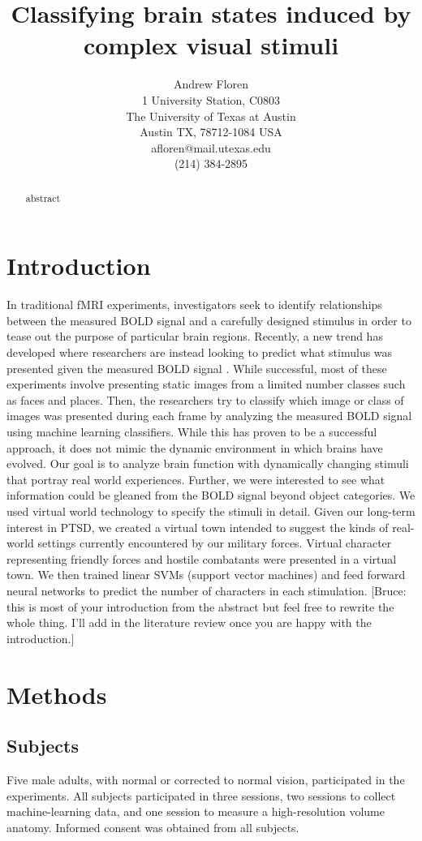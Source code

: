 \documentclass[final]{article}
\title{Classifying brain states induced by complex visual stimuli}
\author{Andrew Floren\\
1 University Station, C0803\\
The University of Texas at Austin\\
Austin TX, 78712-1084 USA\\
afloren@mail.utexas.edu\\
(214) 384-2895\\}
\date{}
\begin{document}
\maketitle

\begin{abstract}
abstract
\end{abstract}

\section{Introduction}
In traditional fMRI experiments, investigators seek to identify relationships between the measured BOLD signal and a carefully designed stimulus in order to tease out the purpose of particular brain regions.
Recently, a new trend has developed where researchers are instead looking to predict what stimulus was presented given the measured BOLD signal \cite{Haxby2001,Mitchell2003,Haynes2006}.
While successful, most of these experiments involve presenting static images from a limited number classes such as faces and places.
Then, the researchers try to classify which image or class of images was presented during each frame by analyzing the measured BOLD signal using machine learning classifiers.
While this has proven to be a successful approach, it does not mimic the dynamic environment in which brains have evolved.
Our goal is to analyze brain function with dynamically changing stimuli that portray real world experiences.
Further, we were interested to see what information could be gleaned from the BOLD signal beyond object categories.
We used virtual world technology to specify the stimuli in detail.
Given our long-term interest in PTSD, we created a virtual town intended to suggest the kinds of real-world settings currently encountered by our military forces.
Virtual character representing friendly forces and hostile combatants were presented in a virtual town.
We then trained linear SVMs (support vector machines) and feed forward neural networks to predict the number of characters in each stimulation.
[Bruce: this is most of your introduction from the abstract but feel free to rewrite the whole thing. I'll add in the literature review once you are happy with the introduction.]

\section{Methods}

\subsection{Subjects}
Five male adults, with normal or corrected to normal vision, participated in the experiments. All subjects
participated in three sessions, two sessions to collect machine-learning data, and one session 
to measure a high-resolution volume anatomy. Informed consent was obtained from all subjects.
\end{document}

